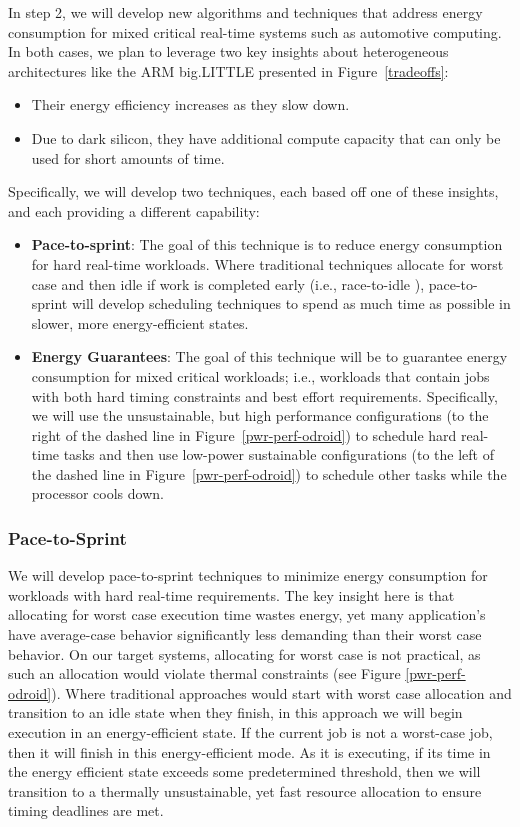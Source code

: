 In step 2, we will develop new algorithms and techniques that address
energy consumption for mixed critical real-time systems such as
automotive computing.  In both cases, we plan to leverage two key
insights about heterogeneous architectures like the ARM big.LITTLE
presented in Figure~\ref{tradeoffs}:
\begin{itemize}
\item Their energy efficiency increases as they slow down.
\item Due to dark silicon, they have additional compute capacity that
  can only be used for short amounts of time.
\end{itemize}

Specifically, we will develop two techniques, each based off one of
these insights, and each providing a different capability:
\begin{itemize}
\item \textbf{Pace-to-sprint}: The goal of this technique is to reduce
  energy consumption for hard real-time workloads.  Where traditional
  techniques allocate for worst case and then idle if work is
  completed early (i.e., race-to-idle \cite{}), pace-to-sprint will
  develop scheduling techniques to spend as much time as possible in
  slower, more energy-efficient states.
\item \textbf{Energy Guarantees}: The goal of this technique will be
  to guarantee energy consumption for mixed critical workloads; i.e.,
  workloads that contain jobs with both hard timing constraints and
  best effort requirements.  Specifically, we will use the
  unsustainable, but high performance configurations (to the right of
  the dashed line in Figure~\ref{pwr-perf-odroid}) to schedule hard
  real-time tasks and then use low-power sustainable configurations
  (to the left of the dashed line in Figure~\ref{pwr-perf-odroid}) to
  schedule other tasks while the processor cools down. 
\end{itemize}


\subsubsection{Pace-to-Sprint}
We will develop pace-to-sprint techniques to minimize energy
consumption for workloads with hard real-time requirements.  The key
insight here is that allocating for worst case execution time wastes
energy, yet many application's have average-case behavior
significantly less demanding than their worst case behavior.  On our
target systems, allocating for worst case is not practical, as such an
allocation would violate thermal constraints (see Figure
\ref{pwr-perf-odroid}).  Where traditional approaches would start with
worst case allocation and transition to an idle state when they
finish, in this approach we will begin execution in an
energy-efficient state.  If the current job is not a worst-case job,
then it will finish in this energy-efficient mode.  As it is
executing, if its time in the energy efficient state exceeds some
predetermined threshold, then we will transition to a thermally
unsustainable, yet fast resource allocation to ensure timing deadlines
are met.

